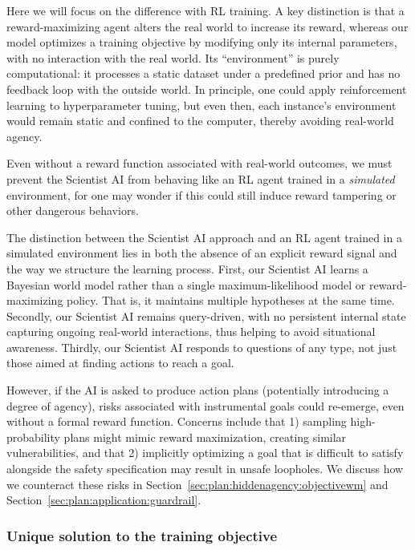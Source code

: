 Here we will focus on the difference with RL training. A key distinction is that a reward-maximizing agent alters the real world to increase its reward, whereas our model optimizes a training objective by modifying only its internal parameters, with no interaction with the real world. Its ``environment'' is purely computational: it processes a static dataset under a predefined prior and has no feedback loop with the outside world. In principle, one could apply reinforcement learning to hyperparameter tuning, but even then, each instance’s environment would remain static and confined to the computer, thereby avoiding real-world agency.

Even without a reward function associated with real-world outcomes, we must prevent the Scientist AI from behaving like an RL agent trained in a \emph{simulated} environment, for one may wonder if this could still induce reward tampering or other dangerous behaviors.

The distinction between the Scientist AI approach and an RL agent trained in a simulated environment lies in both the absence of an explicit reward signal and the way we structure the learning process. First, our Scientist AI learns a Bayesian world model rather than a single maximum-likelihood model or reward-maximizing policy. That is, it maintains multiple hypotheses at the same time. Secondly, our Scientist AI remains query-driven, with no persistent internal state capturing ongoing real-world interactions, thus helping to avoid situational awareness. Thirdly, our Scientist AI responds to questions of any type, not just those aimed at finding actions to reach a goal.

However, if the AI is asked to produce action plans (potentially introducing a degree of agency), risks associated with instrumental goals could re-emerge, even without a formal reward function. Concerns include that 1) sampling high-probability plans might mimic reward maximization, creating similar vulnerabilities, and that 2) implicitly optimizing a goal that is difficult to satisfy alongside the safety specification may result in unsafe loopholes. We discuss how we counteract these risks in Section~\ref{sec:plan:hiddenagency:objectivewm} and Section~\ref{sec:plan:application:guardrail}.

\subsubsection{Unique solution to the training objective}\label{sec:plan:hiddenagency:uniquesolution}
        
